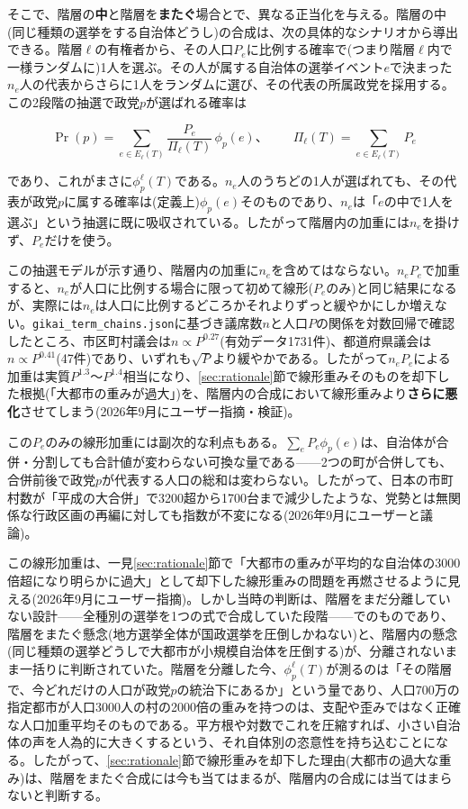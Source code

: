 \documentclass[a4paper,11pt]{ltjsarticle}
\begin{document}
そこで、階層の\textbf{中}と階層を\textbf{またぐ}場合とで、異なる正当化を与える。階層の中(同じ種類の選挙をする自治体どうし)の合成は、次の具体的なシナリオから導出できる。階層$\ell$の有権者から、その人口$P_e$に比例する確率で(つまり階層$\ell$内で一様ランダムに)1人を選ぶ。その人が属する自治体の選挙イベント$e$で決まった$n_e$人の代表からさらに1人をランダムに選び、その代表の所属政党を採用する。この2段階の抽選で政党$p$が選ばれる確率は

\[
\Pr(p) = \sum_{e\in E_\ell(T)} \frac{P_e}{\Pi_\ell(T)}\,\phi_p(e)、\qquad
\Pi_\ell(T) = \sum_{e\in E_\ell(T)} P_e
\]

であり、これがまさに$\phi_p^\ell(T)$である。$n_e$人のうちどの1人が選ばれても、その代表が政党$p$に属する確率は(定義上)$\phi_p(e)$そのものであり、$n_e$は「$e$の中で1人を選ぶ」という抽選に既に吸収されている。したがって階層内の加重には$n_e$を掛けず、$P_e$だけを使う。

この抽選モデルが示す通り、階層内の加重に$n_e$を含めてはならない。$n_eP_e$で加重すると、$n_e$が人口に比例する場合に限って初めて線形($P_e$のみ)と同じ結果になるが、実際には$n_e$は人口に比例するどころかそれよりずっと緩やかにしか増えない。\texttt{gikai\_term\_chains.json}に基づき議席数$n$と人口$P$の関係を対数回帰で確認したところ、市区町村議会は$n\propto P^{0.27}$(有効データ1731件)、都道府県議会は$n\propto P^{0.41}$(47件)であり、いずれも$\sqrt{P}$より緩やかである。したがって$n_eP_e$による加重は実質$P^{1.3}$〜$P^{1.4}$相当になり、\ref{sec:rationale}節で線形重みそのものを却下した根拠(「大都市の重みが過大」)を、階層内の合成において線形重みより\textbf{さらに悪化}させてしまう(2026年9月にユーザー指摘・検証)。

この$P_e$のみの線形加重には副次的な利点もある。$\sum_e P_e\phi_p(e)$は、自治体が合併・分割しても合計値が変わらない可換な量である——2つの町が合併しても、合併前後で政党$p$が代表する人口の総和は変わらない。したがって、日本の市町村数が「平成の大合併」で3200超から1700台まで減少したような、党勢とは無関係な行政区画の再編に対しても指数が不変になる(2026年9月にユーザーと議論)。

この線形加重は、一見\ref{sec:rationale}節で「大都市の重みが平均的な自治体の3000倍超になり明らかに過大」として却下した線形重みの問題を再燃させるように見える(2026年9月にユーザー指摘)。しかし当時の判断は、階層をまだ分離していない設計——全種別の選挙を1つの式で合成していた段階——でのものであり、階層をまたぐ懸念(地方選挙全体が国政選挙を圧倒しかねない)と、階層内の懸念(同じ種類の選挙どうしで大都市が小規模自治体を圧倒する)が、分離されないまま一括りに判断されていた。階層を分離した今、$\phi_p^\ell(T)$が測るのは「その階層で、今どれだけの人口が政党$p$の統治下にあるか」という量であり、人口700万の指定都市が人口3000人の村の2000倍の重みを持つのは、支配や歪みではなく正確な人口加重平均そのものである。平方根や対数でこれを圧縮すれば、小さい自治体の声を人為的に大きくするという、それ自体別の恣意性を持ち込むことになる。したがって、\ref{sec:rationale}節で線形重みを却下した理由(大都市の過大な重み)は、階層をまたぐ合成には今も当てはまるが、階層内の合成には当てはまらないと判断する。
\end{document}
